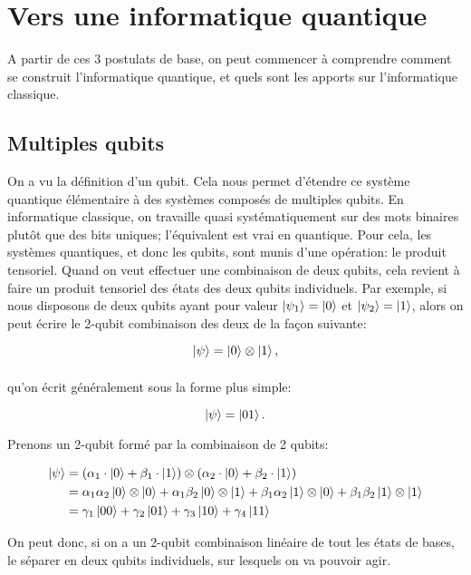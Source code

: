\section{Vers une informatique quantique}
A partir de ces 3 postulats de base, on peut commencer à comprendre comment se construit l'informatique quantique, et quels sont les apports sur l'informatique classique.

\subsection{Multiples qubits}
On a vu la définition d'un qubit. Cela nous permet d'étendre ce système quantique élémentaire à des systèmes composés de multiples qubits. En informatique classique, on travaille quasi systématiquement sur des mots binaires plutôt que des bits uniques; l'équivalent est vrai en quantique. Pour cela, les systèmes quantiques, et donc les qubits, sont munis d'une opération: le produit tensoriel. Quand on veut effectuer une combinaison de deux qubits, cela revient à faire un produit tensoriel des états des deux qubits individuels. Par exemple, si nous disposons de deux qubits ayant pour valeur $\ket{\psi_1} = \ket{0}$ et $\ket{\psi_2} = \ket{1}$, alors on peut écrire le 2-qubit combinaison des deux de la façon suivante:


\begin{equation}
    \ket{\psi} = \ket{0} \mathbin{\mathop{\otimes}\limits_{}} \ket{1},
\end{equation}

qu'on écrit généralement sous la forme plus simple:

\begin{equation}
    \ket{\psi} = \ket{01}.
\end{equation}

Prenons un 2-qubit formé par la combinaison de 2 qubits:

\begin{align*}
\ket{\psi} &= (\alpha_1\cdot\ket{0} + \beta_1\cdot\ket{1}) \otimes (\alpha_2\cdot\ket{0} + \beta_2\cdot\ket{1}) \\
&= \alpha_1\alpha_2 \ket{0} \otimes \ket{0} + \alpha_1\beta_2 \ket{0} \otimes \ket{1} + \beta_1\alpha_2 \ket{1} \otimes \ket{0} + \beta_1\beta_2 \ket{1} \otimes \ket{1} \\
&= \gamma_1 \ket{00} + \gamma_2 \ket{01} + \gamma_3 \ket{10} + \gamma_4 \ket{11}
\end{align*}

On peut donc, si on a un 2-qubit combinaison linéaire de tout les états de bases, le séparer en deux qubits individuels, sur lesquels on va pouvoir agir.

